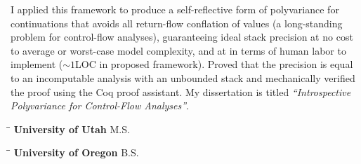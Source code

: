 \documentclass[line]{res}
\begin{document}
\begin{resume}
    I applied this framework to produce a self-reflective form of polyvariance for continuations that avoids all return-flow conflation of values (a long-standing problem for control-flow analyses), guaranteeing ideal stack precision at no cost to average or worst-case model complexity, and at in terms of human labor to implement ($\sim{}\!\!1$LOC in proposed framework).
    Proved that the precision is equal to an incomputable analysis with an unbounded stack and mechanically verified the proof using the Coq proof assistant.
    My dissertation is titled \textit{``Introspective Polyvariance for Control-Flow Analyses''}.
   \vspace{-0.2cm} 
    \begin{tabbing}
    \hspace{2.25in}\= \hspace{2.25in}\= \kill %
    {\bf University of Utah} \>M.S.     
    \end{tabbing}\vspace{-0.5cm}
    \vspace{-0.2cm} 
    \begin{tabbing}
    \hspace{2.25in}\= \hspace{2.25in}\= \kill %
    {\bf University of Oregon} \>B.S.     
    \end{tabbing}\vspace{-0.5cm}

\vspace{0.1in}

\end{resume}
\end{document}

